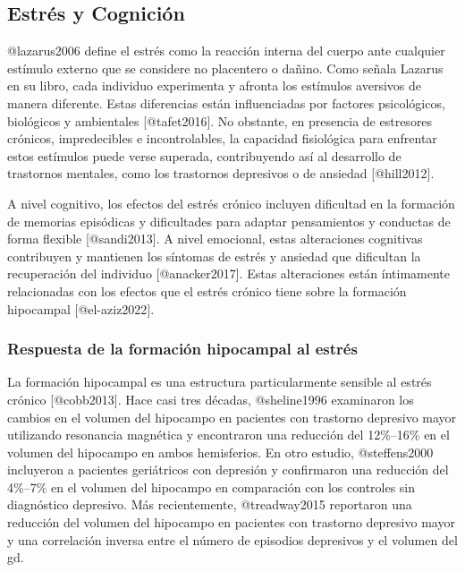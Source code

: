 \documentclass[
  11pt]{../MastersDoctoralThesisUNAM}
\begin{document}
\subsection{Estrés y Cognición}\label{estruxe9s-y-cogniciuxf3n}

@lazarus2006 define el estrés como la reacción interna del cuerpo ante
cualquier estímulo externo que se considere no placentero o dañino. Como
señala Lazarus en su libro, cada individuo experimenta y afronta los
estímulos aversivos de manera diferente. Estas diferencias están
influenciadas por factores psicológicos, biológicos y ambientales
{[}@tafet2016{]}. No obstante, en presencia de estresores crónicos,
impredecibles e incontrolables, la capacidad fisiológica para enfrentar
estos estímulos puede verse superada, contribuyendo así al desarrollo de
trastornos mentales, como los trastornos depresivos o de ansiedad
{[}@hill2012{]}.

A nivel cognitivo, los efectos del estrés crónico incluyen dificultad en
la formación de memorias episódicas y dificultades para adaptar
pensamientos y conductas de forma flexible {[}@sandi2013{]}. A nivel
emocional, estas alteraciones cognitivas contribuyen y mantienen los
síntomas de estrés y ansiedad que dificultan la recuperación del
individuo {[}@anacker2017{]}. Estas alteraciones están íntimamente
relacionadas con los efectos que el estrés crónico tiene sobre la
formación hipocampal {[}@el-aziz2022{]}.

\subsubsection{Respuesta de la formación hipocampal al
estrés}\label{respuesta-de-la-formaciuxf3n-hipocampal-al-estruxe9s}

La formación hipocampal es una estructura particularmente sensible al
estrés crónico {[}@cobb2013{]}. Hace casi tres décadas, @sheline1996
examinaron los cambios en el volumen del hipocampo en pacientes con
trastorno depresivo mayor utilizando resonancia magnética y encontraron
una reducción del 12\%--16\% en el volumen del hipocampo en ambos
hemisferios. En otro estudio, @steffens2000 incluyeron a pacientes
geriátricos \colorbox{BurntOrange}{con depresión} y confirmaron una
reducción del 4\%--7\% en el volumen del hipocampo en comparación con
los controles sin diagnóstico depresivo. Más recientemente,
@treadway2015 reportaron una reducción del volumen del hipocampo en
pacientes con trastorno depresivo mayor y una correlación inversa entre
el número de episodios depresivos y el volumen del \ac{gd}.
\end{document}
